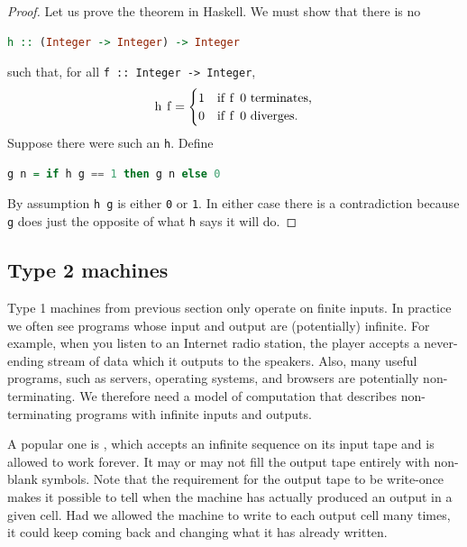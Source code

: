 \begin{proof}
  Let us prove the theorem in Haskell. We must show that there is no
\begin{lstlisting}[language=Haskell]
h :: (Integer -> Integer) -> Integer
\end{lstlisting}
  such that, for all \lstinline!f :: Integer -> Integer!,
  \begin{equation*}
    \text{\lstinline!h f!} =
    \begin{cases}
      \text{\lstinline!1!} & \text{if \lstinline!f 0! terminates,}\\
      \text{\lstinline!0!} & \text{if \lstinline!f 0! diverges.}
    \end{cases}
  \end{equation*}
  Suppose there were such an \lstinline!h!. Define
\begin{lstlisting}[language=Haskell]
g n = if h g == 1 then g n else 0
\end{lstlisting}
  By assumption \lstinline!h g! is either \lstinline!0! or
  \lstinline!1!. In either case there is a contradiction because
  \lstinline!g! does just the opposite of what \lstinline!h! says it
  will do.
\end{proof}

\subsection{Type 2 machines}
\label{sec:type-2}

Type 1 machines from previous section only operate on finite inputs.
In practice we often see programs whose input and output are
(potentially) infinite. For example, when you listen to an Internet
radio station, the player accepts a never-ending stream of data which
it outputs to the speakers. Also, many useful programs, such as servers, operating systems, and browsers are potentially non-terminating. We therefore need a model of computation that describes non-terminating programs with infinite inputs and outputs.

A popular one is , which accepts an
infinite sequence on its input tape and is allowed to work forever. It
may or may not fill the output tape entirely with non-blank symbols.
Note that the requirement for the output tape to be write-once makes
it possible to tell when the machine has actually produced an output
in a given cell. Had we allowed the machine to write to each output
cell many times, it could keep coming back and changing what it has
already written.

